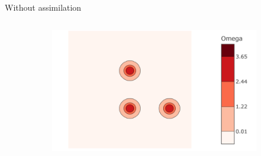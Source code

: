\documentclass[aspectratio=169]{beamer} %
\begin{document}
\begin{frame}{Without assimilation}
\begin{columns}
\begin{column}{0.6\textwidth}
\begin{figure}
\begin{subfigure}{\textwidth}
                    \centering
                    \includegraphics[width=\textwidth]{images/vorticity_field.png}
                \end{subfigure}
            \end{figure}
        \end{column}
    \end{columns}
\end{frame}
\end{document}
